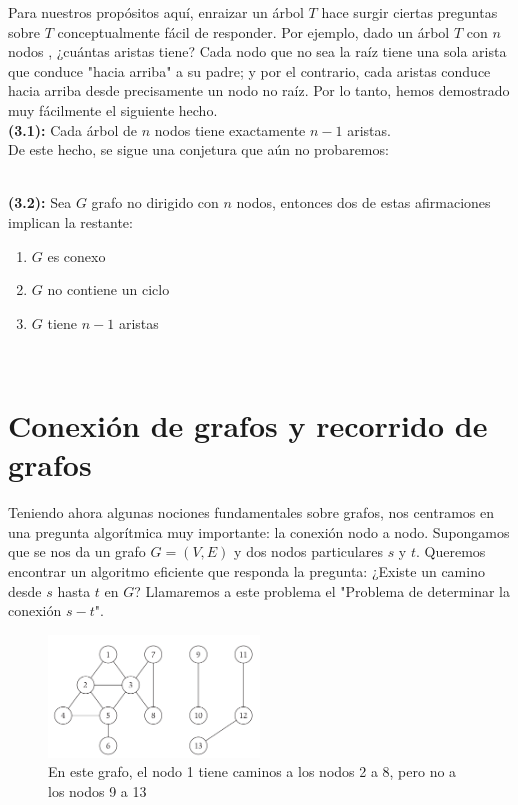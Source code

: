 \documentclass[a4paper, 12pt]{book}
\theoremstyle{dotless}
\begin{document}
Para nuestros propósitos aquí, enraizar un árbol $T$  hace surgir ciertas preguntas sobre $T$ conceptualmente fácil de responder. Por ejemplo, dado un árbol $T$ con $n$ nodos , ¿cuántas aristas tiene? Cada nodo que no sea la raíz tiene una sola arista que conduce "hacia arriba" a su padre; y por el contrario, cada aristas conduce hacia arriba desde precisamente un nodo no raíz. Por lo tanto, hemos demostrado muy fácilmente el siguiente hecho. \\

\textbf{(3.1):} Cada árbol de $n$ nodos tiene exactamente $n- 1$ aristas. \\

De este hecho, se sigue una conjetura que aún no probaremos:\\
\\
 \colorbox{mygray}{\parbox{15cm}{
	\textbf{(3.2):} Sea $G$ grafo no dirigido con $n$ nodos, entonces dos de estas afirmaciones implican la restante:
    \begin{enumerate}
    \item $G$ es conexo
    \item $G$ no contiene un ciclo 
    \item $G$ tiene $n-1$ aristas
    \end{enumerate}

  }}\\

\section{Conexión de grafos y recorrido de grafos}
Teniendo ahora algunas nociones fundamentales sobre grafos, nos centramos en una pregunta algorítmica muy importante: la conexión nodo a nodo. Supongamos que se nos da un grafo $G = (V,E)$ y dos nodos particulares $s$ y $t$. Queremos encontrar un algoritmo eficiente que responda la pregunta: ¿Existe un camino desde $s$ hasta $t$ en $G$? Llamaremos a este problema el "Problema de determinar la conexión $s-t$".\\

\begin{figure}[h]
\centering
\includegraphics[width=0.5\textwidth]{Imagenes-Seccion3/fig32.png}
\caption{En este grafo, el nodo 1 tiene caminos a los nodos 2 a 8, pero no a los nodos 9 a 13}
\label{fig32}
\end{figure}
\end{document}
